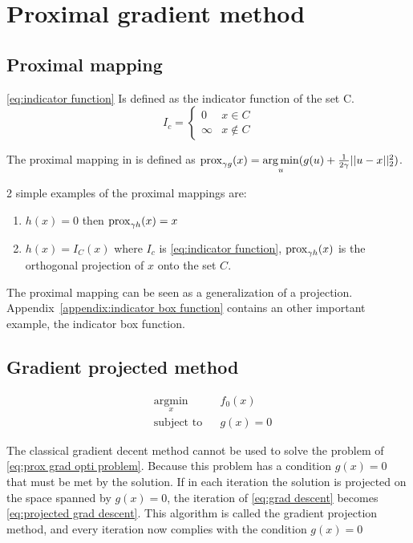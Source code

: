 \chapter{Proximal gradient method}
	\section{Proximal mapping}		
		\eqref{eq:indicator function} Is defined as the indicator function of the set C.
		\begin{equation}
		I_c = 
		\begin{cases}
		0 & x \in C  \\
		\infty & x \notin C
		\end{cases}
		\label{eq:indicator function}
		\end{equation}
		
		The proximal mapping in \cite{NealParikh} is defined as $\operatorname{prox}_{\gamma g}(x)= \underset{u}{\operatorname*{arg\,min}}(g(u) + \frac{1}{2 \gamma}||u-x||^2_2)$. 
		
		2 simple examples of the proximal mappings are:
		\begin{enumerate}
			\item $h(x)=0$ then $\operatorname{prox}_{\gamma h}(x)=x$ 
			\item $h(x)=I_C(x)$ where $I_c$ is \eqref{eq:indicator function}, $\operatorname{prox}_{\gamma h}(x)$ is the orthogonal projection of $x$ onto the set $C$.
		\end{enumerate}

		The proximal mapping can be seen as a generalization of a projection. Appendix~\ref{appendix:indicator box function} contains an other important example, the indicator box function.
	
	\section{Gradient projected method}
		
		\begin{equation}
			\begin{aligned}
			& \underset{x}{\text{argmin}}
			& & f_0(x) \\
			& \text{subject to}
			& & g(x)=0
			\end{aligned}
			\label{eq:prox grad opti problem}
		\end{equation}
		
		The classical gradient decent method cannot be used to solve the problem of \eqref{eq:prox grad opti problem}. Because this problem has a condition $g(x)=0$ that must be met by the solution. If in each iteration the solution is projected on the space spanned by $g(x)=0$, the iteration of \eqref{eq:grad descent} becomes \eqref{eq:projected grad descent}. This algorithm is called the gradient projection method, and every iteration now complies with the condition $g(x)=0$
		
